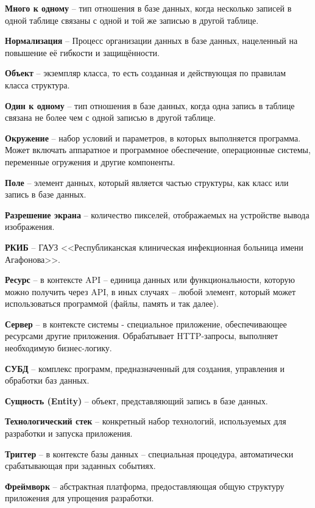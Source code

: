 \documentclass[a4paper,article]{article}
\begin{document}
    \textbf{Много к одному} -- тип отношения в базе данных, когда несколько записей в одной таблице связаны с одной и той же записью в другой таблице.

    \textbf{Нормализация} -- Процесс организации данных в базе данных, нацеленный на повышение её гибкости и защищённости.

    \textbf{Объект} -- экземпляр класса, то есть созданная и действующая по правилам класса структура.

    \textbf{Один к одному} -- тип отношения в базе данных, когда одна запись в таблице связана не более чем с одной записью в другой таблице.

    \textbf{Окружение} -- набор условий и параметров, в которых выполняется программа. Может включать аппаратное и программное обеспечение, операционные системы, переменные огружения и другие компоненты.

    \textbf{Поле} -- элемент данных, который является частью структуры, как класс или запись в базе данных.

    \textbf{Разрешение экрана} -- количество пикселей, отображаемых на устройстве вывода изображения.

    \textbf{РКИБ} -- ГАУЗ <<Республиканская клиническая инфекционная больница имени Агафонова>>.

    \textbf{Ресурс} -- в контексте API -- единица данных или функциональности, которую можно получить через API, в иных случаях -- любой элемент, который может использоваться программой (файлы, память и так далее).

    \textbf{Сервер} -- в контексте системы - специальное приложение, обеспечивающее ресурсами другие приложения. Обрабатывает HTTP-запросы, выполняет необходимую бизнес-логику.

    \textbf{СУБД} -- комплекс программ, предназначенный для создания, управления и обработки баз данных.

    \textbf{Сущность (Entity)} -- объект, представляющий запись в базе данных.

    \textbf{Технологический стек} -- конкретный набор технологий, используемых для разработки и запуска приложения.

    \textbf{Триггер} -- в контексте базы данных -- специальная процедура, автоматически срабатывающая при заданных событиях.

    \textbf{Фреймворк} -- абстрактная платформа, предоставляющая общую структуру приложения для упрощения разработки.

    \newpage
\end{document}
